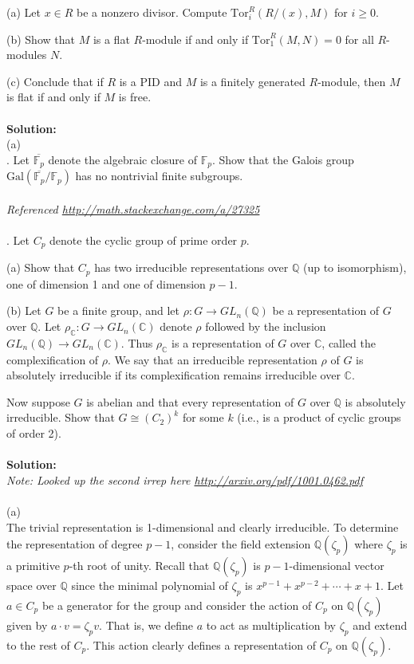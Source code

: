 \documentclass[11pt]{article}
\newcommand{\Q}{\mathbb{Q}}
\newcommand{\F}{\mathbb{F}}
\newcommand{\C}{\mathbb{C}}
\begin{document}
(a) Let $x \in R$ be a nonzero divisor. Compute $\mbox{Tor}_i^R(R/(x), M)$  for $i \ge 0$.

(b) Show that $M$ is a flat $R$-module if and only if $\mbox{Tor}^R_1(M,N) = 0$ for all $R$-modules $N$.

(c) Conclude that if $R$ is a PID and $M$ is a finitely generated $R$-module, then $M$ is
flat if and only if $M$ is free.\\\\
\textbf{Solution:}\\
(a)\\

. Let $\overline{\F_p}$ denote the algebraic closure of $\F_p$. Show that the Galois group $\mbox{Gal}(\overline{\F_p}/\F_p)$ has
no nontrivial finite subgroups.\\\\
\emph{Referenced \url{http://math.stackexchange.com/a/27325}}\\\\
. Let $C_p$ denote the cyclic group of prime order $p$.

(a) Show that $C_p$ has two irreducible representations over $\Q$ (up to isomorphism),
one of dimension 1 and one of dimension $p- 1$.

(b) Let $G$ be a finite group, and let $\rho : G\to GL_n(\Q)$ be a representation of $G$
over $\Q$. Let $\rho_\C : G \to GL_n(\C)$ denote $\rho$ followed by the inclusion $GL_n(\Q) \to 
GL_n(\C)$. Thus $\rho_\C$ is a representation of $G$ over $\C$, called the complexification of
$\rho$. We say that an irreducible representation $\rho$ of $G$ is absolutely irreducible if its
complexification remains irreducible over $\C.$

Now suppose $G$ is abelian and that every representation of $G$ over $\Q$ is absolutely
irreducible. Show that $G \cong  (C_2)^k$
for some $k$ (i.e., is a product of cyclic groups
of order 2).\\\\
\textbf{Solution:}\\
\emph{Note: Looked up the second irrep here \url{http://arxiv.org/pdf/1001.0462.pdf}}\\\\
(a)\\
The trivial representation is 1-dimensional and clearly irreducible. To determine the representation of degree $p-1$, consider the field extension $\Q(\zeta_p)$ where $\zeta_p$ is a primitive $p$-th root of unity. Recall that $\Q(\zeta_p)$ is $p-1$-dimensional vector space over $\Q$ since the minimal polynomial of $\zeta_p$ is $x^{p-1}+x^{p-2}+\cdots + x + 1$. Let $a\in C_p$ be a generator for the group and consider the action of $C_p$ on $\Q(\zeta_p)$ given by  $a\cdot v = \zeta_p v$. That is, we define $a$ to act as multiplication by $\zeta_p$ and extend to the rest of $C_p$. This action clearly defines a representation of $C_p$ on $\Q(\zeta_p)$.
\end{document}
